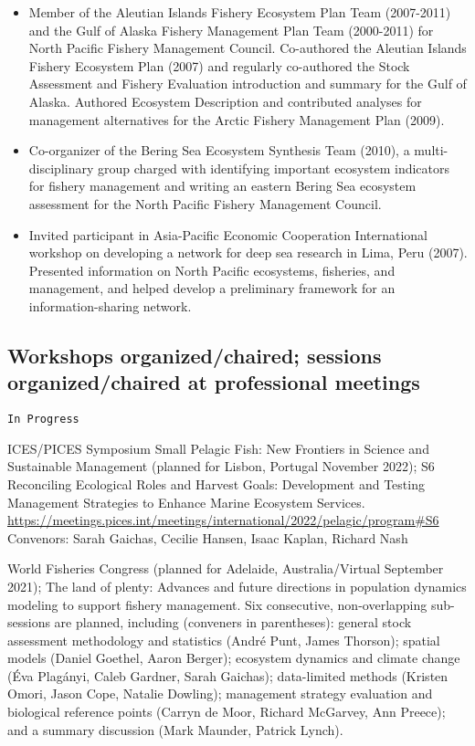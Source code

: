 \documentclass[11pt, a4paper]{awesome-cv}
\providecommand{\tightlist}{%
	\setlength{\itemsep}{0pt}\setlength{\parskip}{0pt}}
\begin{document}
\begin{itemize}
\tightlist
\item
  Member of the Aleutian Islands Fishery Ecosystem Plan Team (2007-2011)
  and the Gulf of Alaska Fishery Management Plan Team (2000-2011) for
  North Pacific Fishery Management Council. Co-authored the Aleutian
  Islands Fishery Ecosystem Plan (2007) and regularly co-authored the
  Stock Assessment and Fishery Evaluation introduction and summary for
  the Gulf of Alaska. Authored Ecosystem Description and contributed
  analyses for management alternatives for the Arctic Fishery Management
  Plan (2009).
\item
  Co-organizer of the Bering Sea Ecosystem Synthesis Team (2010), a
  multi-disciplinary group charged with identifying important ecosystem
  indicators for fishery management and writing an eastern Bering Sea
  ecosystem assessment for the North Pacific Fishery Management Council.
\item
  Invited participant in Asia-Pacific Economic Cooperation International
  workshop on developing a network for deep sea research in Lima, Peru
  (2007). Presented information on North Pacific ecosystems, fisheries,
  and management, and helped develop a preliminary framework for an
  information-sharing network.
\end{itemize}

\hypertarget{workshops-organizedchaired-sessions-organizedchaired-at-professional-meetings}{%
\subsection{Workshops organized/chaired; sessions organized/chaired at
professional
meetings}\label{workshops-organizedchaired-sessions-organizedchaired-at-professional-meetings}}

\begin{verbatim}
In Progress
\end{verbatim}

ICES/PICES Symposium Small Pelagic Fish: New Frontiers in Science and
Sustainable Management (planned for Lisbon, Portugal November 2022); S6
Reconciling Ecological Roles and Harvest Goals: Development and Testing
Management Strategies to Enhance Marine Ecosystem Services.
\url{https://meetings.pices.int/meetings/international/2022/pelagic/program\#S6}
Convenors: Sarah Gaichas, Cecilie Hansen, Isaac Kaplan, Richard Nash

World Fisheries Congress (planned for Adelaide, Australia/Virtual
September 2021); The land of plenty: Advances and future directions in
population dynamics modeling to support fishery management. Six
consecutive, non-overlapping sub-sessions are planned, including
(conveners in parentheses): general stock assessment methodology and
statistics (André Punt, James Thorson); spatial models (Daniel Goethel,
Aaron Berger); ecosystem dynamics and climate change (Éva Plagányi,
Caleb Gardner, Sarah Gaichas); data-limited methods (Kristen Omori,
Jason Cope, Natalie Dowling); management strategy evaluation and
biological reference points (Carryn de Moor, Richard McGarvey, Ann
Preece); and a summary discussion (Mark Maunder, Patrick Lynch).
\end{document}
